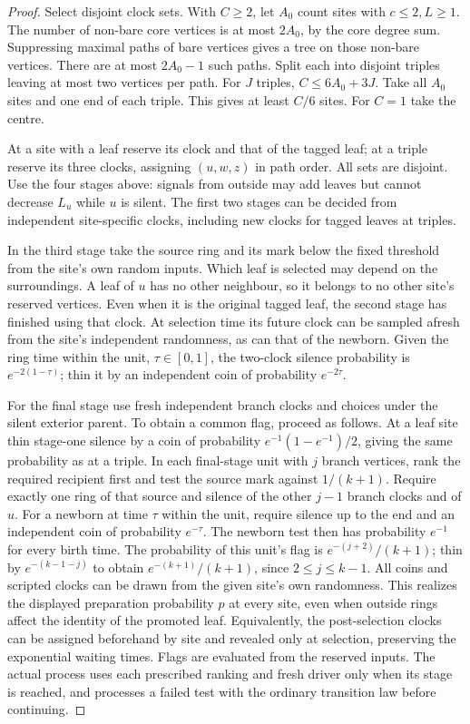 \documentclass[11pt]{article}
\theoremstyle{remark}
\numberwithin{equation}{section}
\begin{document}
\begin{proof}
Select disjoint clock sets. With $C\ge2$, let $A_0$ count sites with $c\le2,L\ge1$. The number of non-bare core vertices is at most $2A_0$, by the core degree sum. Suppressing maximal paths of bare vertices gives a tree on those non-bare vertices. There are at most $2A_0-1$ such paths. Split each into disjoint triples leaving at most two vertices per path. For $J$ triples, $C\le6A_0+3J$. Take all $A_0$ sites and one end of each triple. This gives at least $C/6$ sites. For $C=1$ take the centre.

At a site with a leaf reserve its clock and that of the tagged leaf; at a triple reserve its three clocks, assigning $(u,w,z)$ in path order. All sets are disjoint. Use the four stages above: signals from outside may add leaves but cannot decrease $L_u$ while $u$ is silent. The first two stages can be decided from independent site-specific clocks, including new clocks for tagged leaves at triples.

In the third stage take the source ring and its mark below the fixed threshold from the site's own random inputs. Which leaf is selected may depend on the surroundings. A leaf of $u$ has no other neighbour, so it belongs to no other site's reserved vertices. Even when it is the original tagged leaf, the second stage has finished using that clock. At selection time its future clock can be sampled afresh from the site's independent randomness, as can that of the newborn. Given the ring time within the unit, $\tau\in[0,1]$, the two-clock silence probability is $e^{-2(1-\tau)}$; thin it by an independent coin of probability $e^{-2\tau}$.

For the final stage use fresh independent branch clocks and choices under the silent exterior parent. To obtain a common flag, proceed as follows. At a leaf site thin stage-one silence by a coin of probability $e^{-1}(1-e^{-1})/2$, giving the same probability as at a triple. In each final-stage unit with $j$ branch vertices, rank the required recipient first and test the source mark against $1/(k+1)$. Require exactly one ring of that source and silence of the other $j-1$ branch clocks and of $u$. For a newborn at time $\tau$ within the unit, require silence up to the end and an independent coin of probability $e^{-\tau}$. The newborn test then has probability $e^{-1}$ for every birth time. The probability of this unit's flag is $e^{-(j+2)}/(k+1)$; thin by $e^{-(k-1-j)}$ to obtain $e^{-(k+1)}/(k+1)$, since $2\le j\le k-1$. All coins and scripted clocks can be drawn from the given site's own randomness. This realizes the displayed preparation probability $p$ at every site, even when outside rings affect the identity of the promoted leaf. Equivalently, the post-selection clocks can be assigned beforehand by site and revealed only at selection, preserving the exponential waiting times. Flags are evaluated from the reserved inputs. The actual process uses each prescribed ranking and fresh driver only when its stage is reached, and processes a failed test with the ordinary transition law before continuing.


\end{proof}
\end{document}
